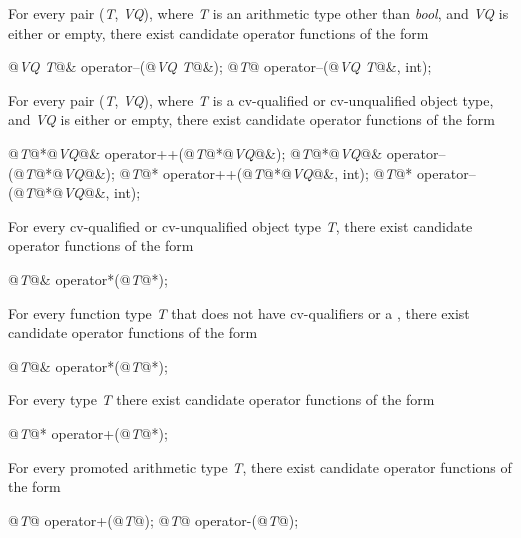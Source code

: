 \pnum
For every pair
(\textit{T},
\textit{VQ}),
where
\textit{T}
is an arithmetic type other than
\textit{bool},
and
\textit{VQ}
is either
or empty,
there exist candidate operator functions of the form

\begin{codeblock}
@\textit{VQ T}@& operator--(@\textit{VQ T}@&);
@\textit{T}@ operator--(@\textit{VQ T}@&, int);
\end{codeblock}

\pnum
For every pair
(\textit{T},
\textit{VQ}),
where
\textit{T}
is a cv-qualified or cv-unqualified object type, and
\textit{VQ}
is either
or empty,
there exist candidate operator functions of the form

\begin{codeblock}
@\textit{T}@*@\textit{VQ}@& operator++(@\textit{T}@*@\textit{VQ}@&);
@\textit{T}@*@\textit{VQ}@& operator--(@\textit{T}@*@\textit{VQ}@&);
@\textit{T}@*    operator++(@\textit{T}@*@\textit{VQ}@&, int);
@\textit{T}@*    operator--(@\textit{T}@*@\textit{VQ}@&, int);
\end{codeblock}

\pnum
For every cv-qualified or cv-unqualified object type
\textit{T},
there exist candidate operator functions of the form

\begin{codeblock}
@\textit{T}@&    operator*(@\textit{T}@*);
\end{codeblock}

\pnum
For every function type
\textit{T} that does not have cv-qualifiers or a ,
there exist candidate operator functions of the form

\begin{codeblock}
@\textit{T}@&    operator*(@\textit{T}@*);
\end{codeblock}

\pnum
For every type \textit{T} there exist candidate operator functions of the form

\begin{codeblock}
@\textit{T}@*    operator+(@\textit{T}@*);
\end{codeblock}

\pnum
For every promoted arithmetic type
\textit{T},
there exist candidate operator functions of the form

\begin{codeblock}
@\textit{T}@ operator+(@\textit{T}@);
@\textit{T}@ operator-(@\textit{T}@);
\end{codeblock}

